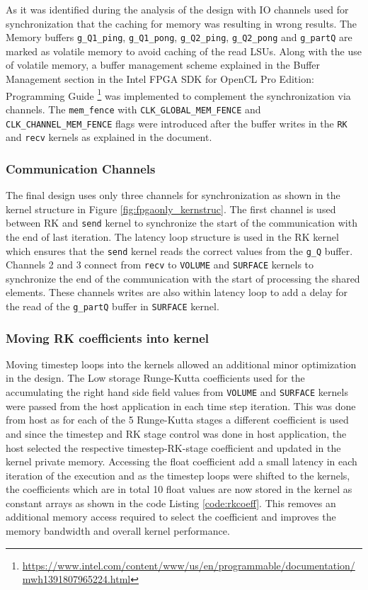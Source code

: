 As it was identified during the analysis of the design with IO channels used
for synchronization \label{sec:sync_iochan} that the caching for memory was resulting
in wrong results. The Memory buffers \texttt{g\_Q1\_ping}, \texttt{g\_Q1\_pong}, \texttt{g\_Q2\_ping},
\texttt{g\_Q2\_pong} and \texttt{g\_partQ} are marked as volatile memory to avoid
caching of the read \ac{LSU}s. Along with the use of volatile memory, a buffer management
scheme explained in the Buffer Management section in the Intel FPGA SDK for OpenCL Pro Edition: Programming Guide
\footnote{\url{https://www.intel.com/content/www/us/en/programmable/documentation/mwh1391807965224.html}}
was implemented to complement the synchronization via channels. The \texttt{mem\_fence}
with \texttt{CLK\_GLOBAL\_MEM\_FENCE} and \texttt{CLK\_CHANNEL\_MEM\_FENCE} flags were introduced
after the buffer writes in the \texttt{RK} and \texttt{recv} kernels as explained in the document.

\subsubsection*{Communication Channels}

The final design uses only three channels for synchronization as shown in the kernel
structure in Figure \ref{fig:fpgaonly_kernstruc}. The first channel is used between RK and
\texttt{send} kernel to synchronize the start of the communication with the end of last iteration.
The latency loop structure is used in the RK kernel which ensures that the \texttt{send}
kernel reads the correct values from the \texttt{g\_Q} buffer. Channels 2 and 3 connect from
\texttt{recv} to \texttt{VOLUME} and \texttt{SURFACE} kernels to synchronize the end of the
communication with the start of processing the shared elements. These channels writes are also within
latency loop to add a delay for the read of the \texttt{g\_partQ} buffer in \texttt{SURFACE} kernel.

\subsubsection*{Moving RK coefficients into kernel}
Moving timestep loops into the kernels allowed an additional minor optimization in the design.
The Low storage Runge-Kutta coefficients used for the accumulating the right hand side field values from
\texttt{VOLUME} and \texttt{SURFACE} kernels were passed from the host application in each time step
iteration. This was done from host as for each of the 5 Runge-Kutta stages a different coefficient is used
and since the timestep and RK stage control was done in host application, the host selected the respective
timestep-RK-stage coefficient and updated in the kernel private memory. Accessing the float coefficient
add a small latency in each iteration of the execution and as the timestep loops were shifted to the kernels,
the coefficients which are in total 10 float values are now stored in the kernel as constant arrays as shown
in the code Listing \ref{code:rkcoeff}. This removes an additional memory access required to select the
coefficient and improves the memory bandwidth and overall kernel performance.

